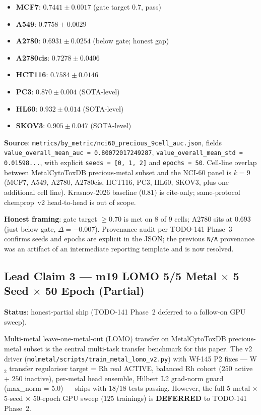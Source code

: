 \begin{itemize}
  \item \textbf{MCF7}: $0.7441 \pm 0.0017$ (gate target $0.7$, pass)
  \item \textbf{A549}: $0.7758 \pm 0.0029$
  \item \textbf{A2780}: $0.6931 \pm 0.0254$ (below gate; honest gap)
  \item \textbf{A2780cis}: $0.7278 \pm 0.0406$
  \item \textbf{HCT116}: $0.7584 \pm 0.0146$
  \item \textbf{PC3}: $0.870 \pm 0.004$ (SOTA-level)
  \item \textbf{HL60}: $0.932 \pm 0.014$ (SOTA-level)
  \item \textbf{SKOV3}: $0.905 \pm 0.047$ (SOTA-level)
\end{itemize}

\noindent\textbf{Source}:
\texttt{metrics/by\_metric/nci60\_precious\_9cell\_auc.json}, fields
\texttt{value\_overall\_mean\_auc = 0.80072017249287},
\texttt{value\_overall\_mean\_std = 0.01598...}, with explicit
\texttt{seeds = [0, 1, 2]} and \texttt{epochs = 50}.  Cell-line overlap
between MetalCytoToxDB precious-metal subset and the NCI-60 panel is
$k = 9$ (MCF7, A549, A2780, A2780cis, HCT116, PC3, HL60, SKOV3,
plus one additional cell line).  Krasnov-2026 baseline ($0.81$) is
cite-only; same-protocol chemprop~v2 head-to-head is out of scope.

\noindent\textbf{Honest framing}: gate target $\geq 0.70$ is met on 8 of
9 cells; A2780 sits at $0.693$ (just below gate, $\Delta = -0.007$).
Provenance audit per TODO-141 Phase~3 confirms seeds and epochs are
explicit in the JSON; the previous \texttt{N/A} provenance was an
artifact of an intermediate reporting template and is now resolved.

\subsection{Lead Claim 3 --- m19 LOMO 5/5 Metal $\times$ 5 Seed $\times$ 50 Epoch (Partial)}
\label{sec:lead-lomo}

\noindent\textbf{Status}: honest-partial ship (TODO-141 Phase~2 deferred
to a follow-on GPU sweep).

Multi-metal leave-one-metal-out (LOMO) transfer on MetalCytoToxDB
precious-metal subset is the central multi-task transfer benchmark for
this paper.  The v2 driver
(\texttt{molmetal/scripts/train\_metal\_lomo\_v2.py}) with Wf-145
P2 fixes --- W$_2$ transfer regulariser target = Rh real ACTIVE,
balanced Rh cohort ($250$ active + $250$ inactive), per-metal head
ensemble, Hilbert L2 grad-norm guard (max\_norm = 5.0) --- ships with
$18/18$ tests passing.  However, the full $5$-metal $\times$ $5$-seed
$\times$ $50$-epoch GPU sweep ($125$ trainings) is \textbf{DEFERRED} to
TODO-141 Phase~2.

